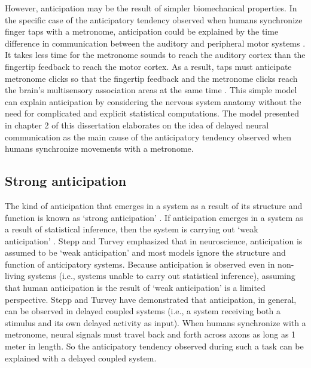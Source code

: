\documentclass{report}
\begin{document}
However, anticipation may be the result of simpler biomechanical properties. In the specific case of the anticipatory tendency observed when humans synchronize finger taps with a metronome, anticipation could be explained by the time difference in communication between the auditory and peripheral motor systems \cite{aschersleben2002temporal}. It takes less time for the metronome sounds to reach the auditory cortex than the fingertip feedback to reach the motor cortex. As a result, taps must anticipate metronome clicks so that the fingertip feedback and the metronome clicks reach the brain's multisensory association areas at the same time \cite{aschersleben2002temporal}. This simple model can explain anticipation by considering the nervous system anatomy without the need for complicated and explicit statistical computations. The model presented in chapter 2 of this dissertation elaborates on the idea of delayed neural communication as the main cause of the anticipatory tendency observed when humans synchronize movements with a metronome. 

\subsection{Strong anticipation}
The kind of anticipation that emerges in a system as a result of its structure and function is known as `strong anticipation' \cite{dubois2001incursive}. If anticipation emerges in a system as a result of statistical inference, then the system is carrying out `weak anticipation' \cite{dubois2001incursive}. Stepp and Turvey \cite{stepp2010strong} emphasized that in neuroscience, anticipation is assumed to be `weak anticipation' and most models ignore the structure and function of anticipatory systems. Because anticipation is observed even in non-living systems (i.e., systems unable to carry out statistical inference), assuming that human anticipation is the result of `weak anticipation' is a limited perspective. Stepp and Turvey \cite{stepp2010strong} have demonstrated that anticipation, in general, can be observed in delayed coupled systems (i.e., a system receiving both a stimulus and its own delayed activity as input). When humans synchronize with a metronome, neural signals must travel back and forth across axons as long as 1 meter in length. So the anticipatory tendency observed during such a task can be explained with a delayed coupled system.
\end{document}
